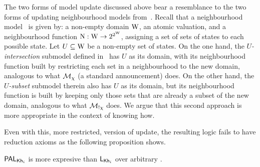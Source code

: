 
The two forms of model update discussed above bear a resemblance to the two forms of updating neighbourhood models from~\cite{MaS18}. Recall that a neighbourhood model~\cite{Scott1970,Montague1970} is given by: a non-empty domain $\operatorname{W}$, an atomic valuation, and a neighbourhood function $\operatorname{N}:\operatorname{W} \to 2^{2^{\operatorname{W}}}$, assigning a set of sets of states to each possible state. Let $U \subseteq \operatorname{W}$ be a non-empty set of states. On the one hand, the \emph{$U$-intersection} submodel defined in~\cite{MaS18} has $U$ as its domain, with its neighbourhood function built by restricting each set in a neighbourhood to the new domain, analogous to what $\mathcal{M}_{\chi}$ (a standard announcement) does.
On the other hand, the \emph{$U$-subset} submodel therein also has $U$ as its domain, but its neighbourhood function is built by keeping only those sets that are already a subset of the new domain, analogous to what $\mathcal{M}_{!\chi}$ does. We argue that this second approach is more appropriate in the context of knowing how.

Even with this, more restricted, version of update, the resulting logic
fails to have reduction axioms as the following proposition shows.

\medskip 

\begin{proposition}\label{prop:exppal}
	$\mathsf{PAL}_{{\sf Kh}_i}$ is more expresive than $\mathsf{L}_{{\sf Kh}_i}$ over arbitrary \ultss.
\end{proposition}


